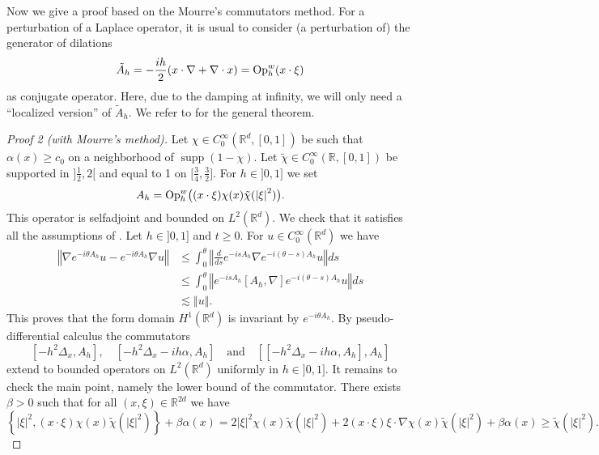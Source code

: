 \documentclass[10pt, a4paper,reqno]{amsart}
\theoremstyle{plain}
\theoremstyle{definition}
\theoremstyle{remark}
\begin{document}
Now we give a proof based on the Mourre's commutators method. For a perturbation of a Laplace operator, it is usual to consider (a perturbation of) the generator of dilations 
\[
\tilde A_h = - \frac {ih}2 (x \cdot \nabla + \nabla \cdot x) = {{\mathop{\rm{Op}}}_h^w}(x\cdot {\xi})
\]
as conjugate operator. Here, due to the damping at infinity, we will only need a ``localized version'' of $\tilde A_h$. We refer to \cite{royer-mourre-formes} for the general theorem.

\begin{proof}[Proof 2 (with Mourre's method)]
Let ${\chi} \in C_0^\infty({\mathbb{R}}^d,[0,1])$ be such that ${\alpha}(x) {\geqslant} c_0$ on a neighborhood of $\operatorname{supp}(1-{\chi})$. Let $\tilde {\chi} \in C_0^\infty({\mathbb{R}},[0,1])$ be supported in $\big]\frac 12, 2\big[$ and equal to 1 on $\big[\frac 34,\frac 32\big]$. For $h \in ]0,1]$ we set 
\[
A_h = {{\mathop{\rm{Op}}}_h^w} \big( (x \cdot {\xi}) {\chi}(x) \tilde {\chi} ({\left\vert {\xi}\right\vert}^2) \big).
\]
This operator is selfadjoint and bounded on $L^2({\mathbb{R}}^d)$. We check that it satisfies all the assumptions of \cite[Theorem 4.1]{royer-mourre-formes}. Let $h \in ]0,1]$ and $t {\geqslant} 0$. For $u \in C_0^\infty({\mathbb{R}}^d)$ we have 
\begin{align*}
{\left\Vert {\nabla e^{-i {\theta} A_h}u - e^{-i {\theta} A_h} \nabla u}\right\Vert}
& {\leqslant} \int_0^{\theta} {\left\Vert {\frac d {ds} e^{-is A_h} \nabla e^{-i({\theta}-s)A_h} u}\right\Vert} ds\\
& {\leqslant} \int_0^{\theta} {\left\Vert {e^{-is A_h} [A_h,\nabla] e^{-i({\theta}-s) A_h} u}\right\Vert}ds\\
& \lesssim {\left\Vert {u}\right\Vert}.
\end{align*}
This proves that the form domain $H^1({\mathbb{R}}^d)$ is invariant by $e^{-i{\theta} A_h}$. By pseudo-differential calculus the commutators 
\[
[-h^2 {{\Delta}_x} , A_h], \quad [-h^2 {{\Delta}_x} -ih{\alpha},A_h] \quad \text{and} \quad [[-h^2 {{\Delta}_x} -ih{\alpha},A_h] , A_h]
\]
extend to bounded operators on $L^2({\mathbb{R}}^d)$ uniformly in $h \in ]0,1]$. It remains to check the main point, namely the lower bound of the commutator. There exists ${\beta} > 0$ such that for all $(x,{\xi}) \in {\mathbb{R}}^{2d}$ we have 
\[
\left\{ {\left\vert {\xi}\right\vert}^2 , (x \cdot {\xi}) {\chi}(x) \tilde {\chi}({\left\vert {\xi}\right\vert}^2) \right\} + {\beta} {\alpha} (x) = 2 {\left\vert {\xi}\right\vert}^2  {\chi}(x) \tilde {\chi}({\left\vert {\xi}\right\vert}^2) + 2 (x\cdot {\xi}) {\xi} \cdot \nabla {\chi}(x) \tilde {\chi} ({\left\vert {\xi}\right\vert}^2)+ {\beta} {\alpha}(x) {\geqslant}  \tilde {\chi}({\left\vert {\xi}\right\vert}^2).
\]
\end{proof}
\end{document}
